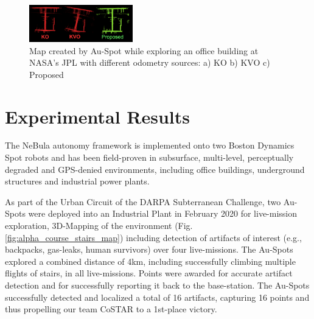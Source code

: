 \documentclass[letterpaper, 10pt, conference]{ieeeconf}      %
\newcommand{\todo}[1]{{\color{red} #1 }} %
\newcommand{\inst}[1]{{\color{orange} #1 }} %
\newcommand{\rev}[1]{{\color{blue} #1 }} %
\begin{document}
\begin{figure}[t!]
  \centering
  \includegraphics[width=0.4\textwidth]{spot_iros/graphics/spot_proposed_office.PNG}
  \caption{Map created by Au-Spot while exploring an office building at NASA's JPL with different odometry sources: a) KO b) KVO c) Proposed}
  \label{spot_indoor_office}
\end{figure}




\section{Experimental Results}\label{sec:experiments}

The NeBula autonomy framework is implemented onto two Boston Dynamics Spot robots and has been field-proven in subsurface, multi-level, perceptually degraded and GPS-denied environments, including office buildings, underground structures and industrial power plants.

As part of the Urban Circuit of the DARPA Subterranean Challenge, two Au-Spots were deployed into an Industrial Plant in February 2020 for live-mission exploration, 3D-Mapping of the environment (Fig. \ref{fig:alpha_course_stairs_map}) including detection of artifacts of interest (e.g., backpacks, gas-leaks, human survivors) over four live-missions. %
The Au-Spots explored a combined distance of 4km, including successfully climbing multiple flights of stairs, in all live-missions. Points were awarded for accurate artifact detection and for successfully reporting it back to the base-station.   
The Au-Spots successfully detected and localized a total of 16 artifacts, capturing 16 points and thus propelling our team CoSTAR to a 1st-place victory. %
\end{document}
